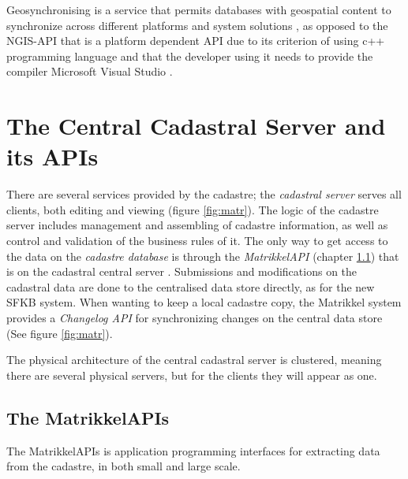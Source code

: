 Geosynchronising is a service that permits databases with geospatial content to synchronize across different platforms and system solutions \citep{Kartverket2013}, as opposed to the NGIS-API that is a platform dependent API due to its criterion of using c++ programming language and that the developer using it needs to provide the compiler Microsoft Visual Studio \citep{Kartverket2017b, Norkart2011}.

\section{The Central Cadastral Server and its APIs}
There are several services provided by the cadastre; the \textit{cadastral server} serves all clients, both editing and viewing (figure \ref{fig:matr}). The logic of the cadastre server includes management and assembling of cadastre information, as well as control and validation of the business rules of it. The only way to get access to the data on the \textit{cadastre database} is through the \textit{MatrikkelAPI} (chapter \ref{matrikkelapi}) that is on the cadastral central server \citep[p.~338]{Matrikkelavdelingen2017}. Submissions and modifications on the cadastral data are done to the centralised data store directly, as for the new SFKB system. When wanting to keep a local cadastre copy, the Matrikkel system provides a \textit{Changelog API} for synchronizing changes on the central data store (See figure \ref{fig:matr}). 

The physical architecture of the central cadastral server is clustered, meaning there are several physical servers, but for the clients they will appear as one. %


\subsection{The MatrikkelAPIs} \label{matrikkelapi}
The MatrikkelAPIs is application programming interfaces for extracting data from the cadastre, in both small and large scale.  

